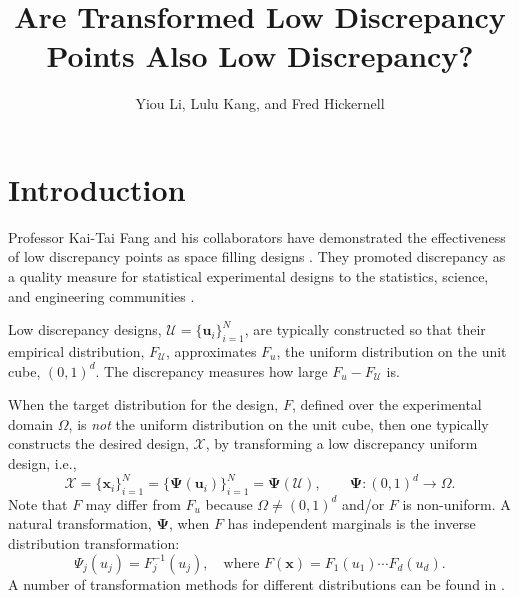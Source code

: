\documentclass[graybox]{svmult}
\newcommand{\vx}{\boldsymbol{x}}
\newcommand{\vu}{\boldsymbol{u}}
\newcommand{\vPsi}{\boldsymbol{\Psi}}
\newcommand{\Udes}{\mathcal{U}}
\newcommand{\Xdes}{\mathcal{X}}
\newcommand{\Ftar}{F}
\newcommand{\cube}{\ensuremath{(0,1)^d}}
\begin{document}
\title*{Are Transformed Low Discrepancy Points Also Low Discrepancy?}
\author{Yiou Li, Lulu Kang, and Fred Hickernell}
%
%
\maketitle


\section{Introduction}

Professor Kai-Tai Fang and his collaborators have demonstrated the effectiveness of low discrepancy points as space filling designs \cite{FanWan94, FanLiSud06, FangHic07a}.  
They promoted discrepancy as a quality measure for statistical experimental designs to the statistics, science, and engineering communities \cite{FanMaWin02, FanMuk00, FanMa01a, FanMa01b}. 

Low discrepancy designs, $\Udes = \{\vu_i\}_{i=1}^N$, are typically constructed so that their empirical distribution, $F_\Udes$, approximates $F_u$, the uniform distribution on the unit cube, \cube.  
The discrepancy measures how large $F_u-F_\Udes$ is.  

When the target distribution for the design, $\Ftar$, defined over the experimental domain $\Omega$, is \emph{not} the uniform distribution on the unit cube, then one typically constructs the desired design, $\Xdes$, by transforming a low discrepancy uniform design, i.e., 
\begin{equation} \label{eq:transPts}
\Xdes = \{\vx_i\}_{i=1}^N = \{\vPsi(\vu_i)\}_{i=1}^N = \vPsi(\Udes), \qquad \vPsi: \cube \to \Omega.
\end{equation}
Note that $\Ftar$ may differ from $F_u$ because $\Omega \ne \cube$ and/or $\Ftar$ is non-uniform.  
A natural transformation, $\vPsi$, when $\Ftar$ has independent marginals is the inverse distribution transformation:
\begin{equation}\label{eq:inverse}
\Psi_j(u_j) = F_j^{-1}(u_j), \quad \text{where } \Ftar(\vx) = F_1(u_1) \cdots F_d(u_d).
\end{equation}
A number of transformation methods for different distributions can be found in \cite{devroye2006nonuniform}. 
\end{document}
